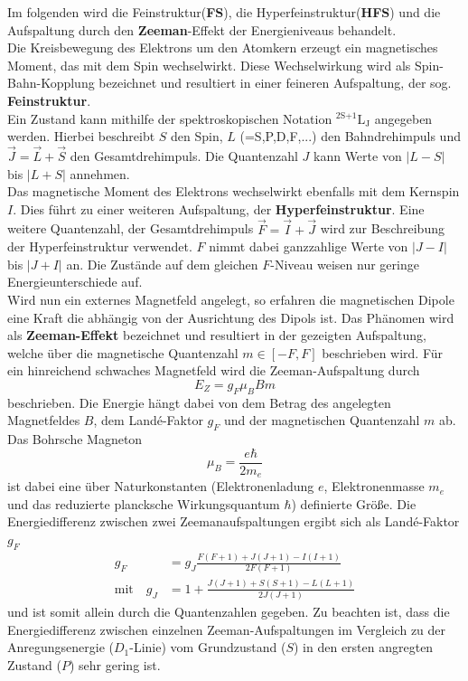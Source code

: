 Im folgenden wird die Feinstruktur(\textbf{FS}), die Hyperfeinstruktur(\textbf{HFS}) und die Aufspaltung durch den \textbf{Zeeman}-Effekt der Energieniveaus behandelt.
\\
Die Kreisbewegung des Elektrons um den Atomkern erzeugt ein magnetisches Moment, das mit dem Spin wechselwirkt.
Diese Wechselwirkung wird als Spin-Bahn-Kopplung bezeichnet und resultiert in einer feineren Aufspaltung, der sog. \textbf{Feinstruktur}.
\\
Ein Zustand kann mithilfe der spektroskopischen Notation $^\text{2S+1}\text{L}_\text{J}$ angegeben werden.
Hierbei beschreibt $S$ den Spin, $L$ (=S,P,D,F,...) den Bahndrehimpuls und $\vec{J} = \vec{L} + \vec{S}$ den Gesamtdrehimpuls.
Die Quantenzahl $J$ kann Werte von $|L-S|$ bis $|L+S|$ annehmen.
\\
Das magnetische Moment des Elektrons wechselwirkt ebenfalls mit dem Kernspin $I$.
Dies führt zu einer weiteren Aufspaltung, der \textbf{Hyperfeinstruktur}.
Eine weitere Quantenzahl, der Gesamtdrehimpuls $\vec{F} = \vec{I} + \vec{J}$ wird zur Beschreibung der Hyperfeinstruktur verwendet.
$F$ nimmt dabei ganzzahlige Werte von $|J-I|$ bis $|J+I|$ an.
Die Zustände auf dem gleichen $F$-Niveau weisen nur geringe Energieunterschiede auf.
\\
Wird nun ein externes Magnetfeld angelegt, so erfahren die magnetischen Dipole eine Kraft die abhängig von der Ausrichtung des Dipols ist.
Das Phänomen wird als \textbf{Zeeman-Effekt} bezeichnet und resultiert in der gezeigten Aufspaltung, welche über die magnetische Quantenzahl $m \in [-F, F]$ beschrieben wird.
Für ein hinreichend schwaches Magnetfeld wird die Zeeman-Aufspaltung durch
\begin{equation}
    E_Z = g_F \mu_B B m
    \label{eqn:zeeman_1}
\end{equation}
beschrieben.
Die Energie hängt dabei von dem Betrag des angelegten Magnetfeldes $B$, dem Landé-Faktor $g_F$ und der magnetischen Quantenzahl $m$ ab.
Das Bohrsche Magneton
\begin{equation}
    \mu_B = \frac{e \hbar}{2 m_e}
\end{equation}
ist dabei eine über Naturkonstanten (Elektronenladung $e$, Elektronenmasse $m_e$ und das reduzierte plancksche Wirkungsquantum $\hbar$) definierte Größe.
Die Energiedifferenz zwischen zwei Zeemanaufspaltungen ergibt sich als Landé-Faktor $g_F$
\begin{align}
    g_F &= g_J \frac{F(F+1) + J(J+1) - I(I+1)}{2F(F+1)} \label{eqn:g_F} \\
    \text{mit} \quad g_J &= 1 + \frac{J(J+1) + S(S+1) - L(L+1)}{2J(J+1)} \label{eqn:g_J}
\end{align}
und ist somit allein durch die Quantenzahlen gegeben.
Zu beachten ist, dass die Energiedifferenz zwischen einzelnen Zeeman-Aufspaltungen im Vergleich zu der Anregungsenergie ($D_1$-Linie) vom Grundzustand ($S$) in den ersten angregten Zustand ($P$) sehr gering ist.
\FloatBarrier

